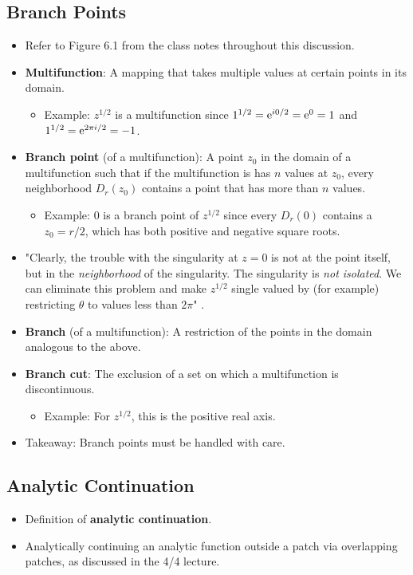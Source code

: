 \documentclass[../finalProject.tex]{subfiles}
\begin{document}
\subsection{Branch Points}
\begin{itemize}
    \item Refer to Figure 6.1 from the class notes throughout this discussion.
    \item \textbf{Multifunction}: A mapping that takes multiple values at certain points in its domain.
    \begin{itemize}
        \item Example: $z^{1/2}$ is a multifunction since $1^{1/2}=\e[i0/2]=\e[0]=1$ and $1^{1/2}=\e[2\pi i/2]=-1$.
    \end{itemize}
    \item \textbf{Branch point} (of a multifunction): A point $z_0$ in the domain of a multifunction such that if the multifunction is has $n$ values at $z_0$, every neighborhood $D_r(z_0)$ contains a point that has more than $n$ values.
    \begin{itemize}
        \item Example: 0 is a branch point of $z^{1/2}$ since every $D_r(0)$ contains a $z_0=r/2$, which has both positive and negative square roots.
    \end{itemize}
    \item "Clearly, the trouble with the singularity at $z=0$ is not at the point itself, but in the \emph{neighborhood} of the singularity. The singularity is \emph{not isolated}. We can eliminate this problem and make $z^{1/2}$ single valued by (for example) restricting $\theta$ to values less than $2\pi$" \parencite[121]{bib:Seaborn}.
    \item \textbf{Branch} (of a multifunction): A restriction of the points in the domain analogous to the above.
    \item \textbf{Branch cut}: The exclusion of a set on which a multifunction is discontinuous.
    \begin{itemize}
        \item Example: For $z^{1/2}$, this is the positive real axis.
    \end{itemize}
    \item Takeaway: Branch points must be handled with care.
\end{itemize}


\subsection{Analytic Continuation}
\begin{itemize}
    \item Definition of \textbf{analytic continuation}.
    \item Analytically continuing an analytic function outside a patch via overlapping patches, as discussed in the 4/4 lecture.
\end{itemize}
\end{document}
